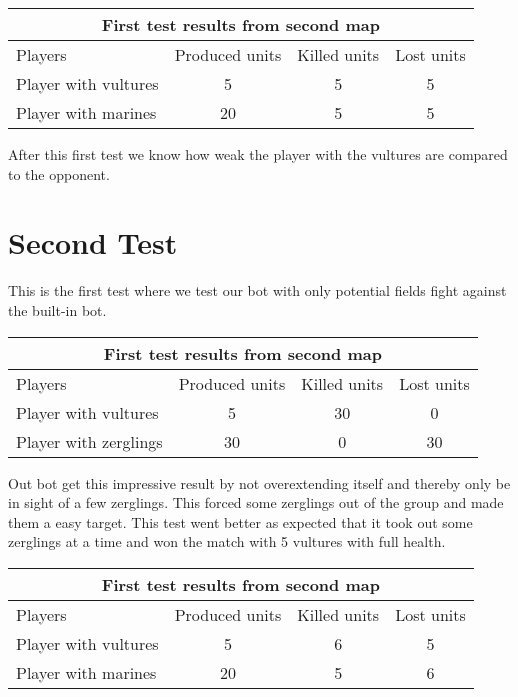 \begin{centering}
 \begin{tabular}{|l||c|c|c|}
	\multicolumn{5}{c}{First test results from second map} \\
	\hline
	Players & Produced units & Killed units & Lost units\\
	\hline
		Player with vultures & 5 & 5 & 5\\
	\hline
		Player with marines & 20 & 5 & 5\\
	\hline

\end{tabular}
\end{centering}

After this first test we know how weak the player with the vultures are compared to the opponent.

\section{Second Test}
This is the first test where we test our bot with only potential fields fight against the built-in bot.

\begin{centering}
 \begin{tabular}{|l||c|c|c|}
	\multicolumn{5}{c}{First test results from second map} \\
	\hline
	Players & Produced units & Killed units & Lost units\\
	\hline
	\hline
		Player with vultures & 5 & 30 & 0\\
	\hline
		Player with zerglings & 30 & 0 & 30\\
	\hline

\end{tabular}
\end{centering}

Out bot get this impressive result by not overextending itself and thereby only be in sight of a few zerglings. This forced some zerglings out of the group and made them a easy target. This test went better as expected that it took out some zerglings at a time and won the match with 5 vultures with full health.

\begin{centering}
 \begin{tabular}{|l||c|c|c|}
	\multicolumn{5}{c}{First test results from second map} \\
	\hline
	Players & Produced units & Killed units & Lost units\\
	\hline
	\hline
		Player with vultures & 5 & 6 & 5\\
	\hline
		Player with marines & 20 & 5 & 6\\
	\hline

\end{tabular}
\end{centering}


